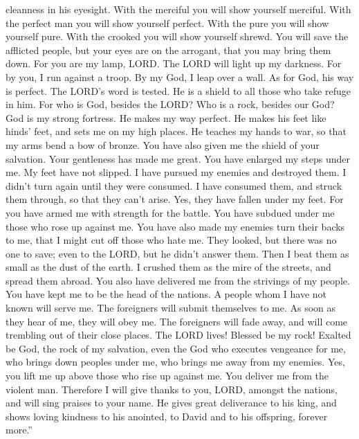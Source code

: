 cleanness in his eyesight.  With the merciful you will show
yourself merciful. With the perfect man you will show yourself perfect.
 With the pure you will show yourself pure. With the
crooked you will show yourself shrewd.  You will save the
afflicted people, but your eyes are on the arrogant, that you may bring
them down.  For you are my lamp, LORD. The LORD will light
up my darkness.  For by you, I run against a troop. By my
God, I leap over a wall.  As for God, his way is perfect.
The LORD's word is tested. He is a shield to all those who take refuge
in him.  For who is God, besides the LORD? Who is a rock,
besides our God?  God is my strong fortress. He makes my
way perfect.  He makes his feet like hinds' feet, and sets
me on my high places.  He teaches my hands to war, so that
my arms bend a bow of bronze.  You have also given me the
shield of your salvation. Your gentleness has made me great.
 You have enlarged my steps under me. My feet have not
slipped.  I have pursued my enemies and destroyed them. I
didn't turn again until they were consumed.  I have
consumed them, and struck them through, so that they can't arise. Yes,
they have fallen under my feet.  For you have armed me with
strength for the battle. You have subdued under me those who rose up
against me.  You have also made my enemies turn their backs
to me, that I might cut off those who hate me.  They
looked, but there was no one to save; even to the LORD, but he didn't
answer them.  Then I beat them as small as the dust of the
earth. I crushed them as the mire of the streets, and spread them
abroad.  You also have delivered me from the strivings of
my people. You have kept me to be the head of the nations. A people whom
I have not known will serve me.  The foreigners will submit
themselves to me. As soon as they hear of me, they will obey me.
 The foreigners will fade away, and will come trembling out
of their close places.  The LORD lives! Blessed be my rock!
Exalted be God, the rock of my salvation,  even the God who
executes vengeance for me, who brings down peoples under me,
 who brings me away from my enemies. Yes, you lift me up
above those who rise up against me. You deliver me from the violent man.
 Therefore I will give thanks to you, LORD, amongst the
nations, and will sing praises to your name.  He gives
great deliverance to his king, and shows loving kindness to his
anointed, to David and to his offspring, forever more.''

